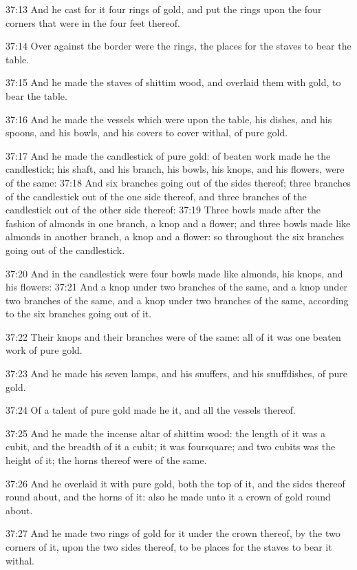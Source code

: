 37:13 And he cast for it four rings of gold, and put the rings upon
the four corners that were in the four feet thereof.

37:14 Over against the border were the rings, the places for the
staves to bear the table.

37:15 And he made the staves of shittim wood, and overlaid them with
gold, to bear the table.

37:16 And he made the vessels which were upon the table, his dishes,
and his spoons, and his bowls, and his covers to cover withal, of pure
gold.

37:17 And he made the candlestick of pure gold: of beaten work made he
the candlestick; his shaft, and his branch, his bowls, his knops, and
his flowers, were of the same: 37:18 And six branches going out of the
sides thereof; three branches of the candlestick out of the one side
thereof, and three branches of the candlestick out of the other side
thereof: 37:19 Three bowls made after the fashion of almonds in one
branch, a knop and a flower; and three bowls made like almonds in
another branch, a knop and a flower: so throughout the six branches
going out of the candlestick.

37:20 And in the candlestick were four bowls made like almonds, his
knops, and his flowers: 37:21 And a knop under two branches of the
same, and a knop under two branches of the same, and a knop under two
branches of the same, according to the six branches going out of it.

37:22 Their knops and their branches were of the same: all of it was
one beaten work of pure gold.

37:23 And he made his seven lamps, and his snuffers, and his
snuffdishes, of pure gold.

37:24 Of a talent of pure gold made he it, and all the vessels
thereof.

37:25 And he made the incense altar of shittim wood: the length of it
was a cubit, and the breadth of it a cubit; it was foursquare; and two
cubits was the height of it; the horns thereof were of the same.

37:26 And he overlaid it with pure gold, both the top of it, and the
sides thereof round about, and the horns of it: also he made unto it a
crown of gold round about.

37:27 And he made two rings of gold for it under the crown thereof, by
the two corners of it, upon the two sides thereof, to be places for
the staves to bear it withal.

